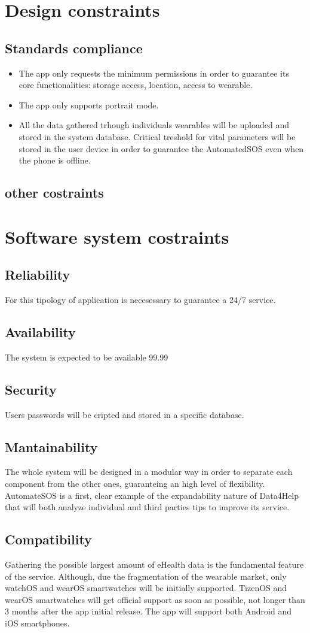 \section{Design constraints}
\subsection{Standards compliance}
\begin{itemize}
\item The app only requests the minimum permissions in order to guarantee its core functionalities: storage access, location, access to wearable.
\item The app only supports portrait mode.
\item All the data gathered trhough individuals wearables will be uploaded and stored in the system database.
Critical treshold for vital parameters will be stored in the user device in order to guarantee the AutomatedSOS even when the phone is offline.
\end{itemize}


\subsection{other costraints}

\section{Software system costraints}
\subsection{Reliability}
For this tipology of application is necesessary to guarantee a 24/7 service.
\subsection{Availability}
The system is expected to be available 99.99%
\subsection{Security}
Users passwords will be cripted and stored in a specific database.
\subsection{Mantainability}
The whole system will be designed in a modular way in order to separate each component from the other ones, guaranteing an high level of flexibility. AutomateSOS is a first, clear example of the expandability nature of Data4Help that will both analyze individual and third parties tips to improve its service.
\subsection{Compatibility}
Gathering the possible largest amount of eHealth data is the fundamental feature of the service. Although, due the fragmentation of the wearable market, only watchOS and wearOS smartwatches will be initially supported. TizenOS and wearOS smartwatches will get official support as soon as possible, not longer than 3 months after the app initial release.
The app will support both Android and iOS smartphones. 